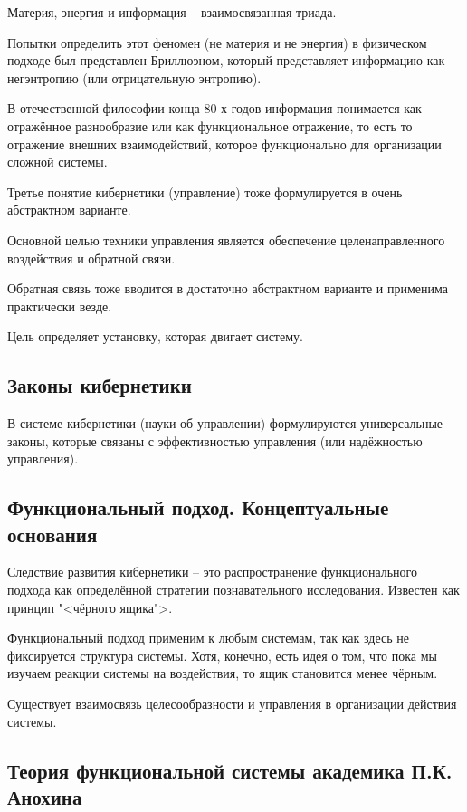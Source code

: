 \documentclass[main.tex]{subfiles}
\begin{document}
Материя, энергия и информация -- взаимосвязанная триада.

Попытки определить этот феномен (не материя и не энергия) в физическом подходе был представлен Бриллюэном, который представляет информацию как негэнтропию (или отрицательную энтропию).

В отечественной философии конца 80-х годов информация понимается как отражённое разнообразие или как функциональное отражение, то есть то отражение внешних взаимодействий, которое функционально для организации сложной системы.


Третье понятие кибернетики (управление) тоже формулируется в очень абстрактном варианте.

Основной целью техники управления является обеспечение целенаправленного воздействия и обратной связи.

Обратная связь тоже вводится в достаточно абстрактном варианте и применима практически везде.

Цель определяет установку, которая двигает систему.

\subsection{Законы кибернетики}


В системе кибернетики (науки об управлении) формулируются универсальные законы, которые связаны с эффективностью управления (или надёжностью управления).

\subsection{Функциональный подход. Концептуальные основания}


Следствие развития кибернетики -- это распространение функционального подхода как определённой стратегии познавательного исследования.
Известен как принцип "<чёрного ящика">.

Функциональный подход применим к любым системам, так как здесь не фиксируется структура системы.
Хотя, конечно, есть идея о том, что пока мы изучаем реакции системы на воздействия, то ящик становится менее чёрным.

Существует взаимосвязь целесообразности и управления в организации действия системы.

\subsection{Теория функциональной системы академика П.К. Анохина}
\end{document}
